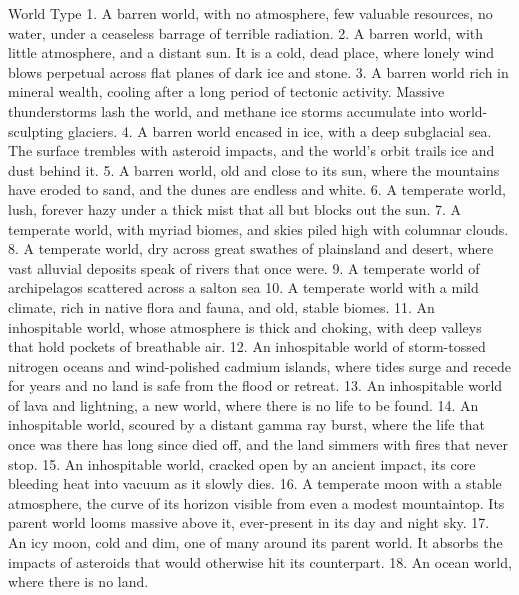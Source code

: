 World Type
     1.  A barren world, with no atmosphere, few valuable resources, no water, under a ceaseless
         barrage of terrible radiation.
     2.  A barren world, with little atmosphere, and a distant sun. It is a cold, dead place, where
         lonely wind blows perpetual across flat planes of dark ice and stone.
     3.  A barren world rich in mineral wealth, cooling after a long period of tectonic activity.
         Massive thunderstorms lash the world, and methane ice storms accumulate into world-
         sculpting glaciers.
    4.   A barren world encased in ice, with a deep subglacial sea. The surface trembles with
         asteroid impacts, and the world’s orbit trails ice and dust behind it.
     5.  A barren world, old and close to its sun, where the mountains have eroded to sand, and
         the dunes are endless and white.
     6.  A temperate world, lush, forever hazy under a thick mist that all but blocks out the sun.
     7.  A temperate world, with myriad biomes, and skies piled high with columnar clouds.
     8.  A temperate world, dry across great swathes of plainsland and desert, where vast alluvial
         deposits speak of rivers that once were.
     9.  A temperate world of archipelagos scattered across a salton sea
     10. A temperate world with a mild climate, rich in native flora and fauna, and old, stable
         biomes.
     11. An inhospitable world, whose atmosphere is thick and choking, with deep valleys that hold
         pockets of breathable air.
     12. An inhospitable world of storm-tossed nitrogen oceans and wind-polished cadmium
         islands, where tides surge and recede for years and no land is safe from the flood or
         retreat.
     13. An inhospitable world of lava and lightning, a new world, where there is no life to be found.
     14. An inhospitable world, scoured by a distant gamma ray burst, where the life that once was
         there has long since died off, and the land simmers with fires that never stop.
     15. An inhospitable world, cracked open by an ancient impact, its core bleeding heat into
         vacuum as it slowly dies.
     16. A temperate moon with a stable atmosphere, the curve of its horizon visible from even a
         modest mountaintop. Its parent world looms massive above it, ever-present in its day and
         night sky.
     17. An icy moon, cold and dim, one of many around its parent world. It absorbs the impacts of
         asteroids that would otherwise hit its counterpart.
     18. An ocean world, where there is no land.




